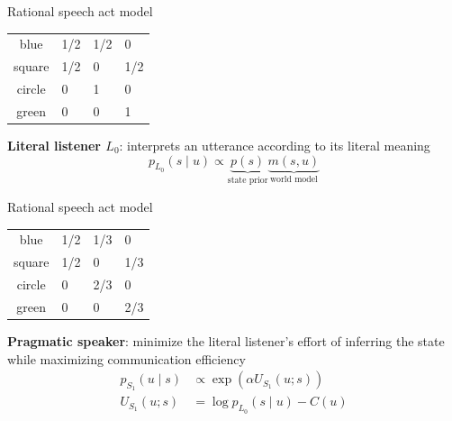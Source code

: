 \documentclass[usenames,dvipsnames,notes]{beamer}
\begin{document}
\begin{frame}
    {Rational speech act model}
    \begin{center}

        \begin{tabular}{cp{2cm}p{2cm}p{2cm}}
        blue & 1/2 & 1/2 & 0 \\
        square & 1/2 & 0 & 1/2 \\
        circle & 0 & 1 & 0 \\
        green & 0 & 0 & 1
        \end{tabular}
    \end{center}
    \textbf{Literal listener $L_0$}: interprets an utterance according to its literal meaning
    $$
    p_{L_0}(s\mid u) \propto \underbrace{p(s)}_{\text{state prior}}
    \underbrace{m(s,u)}_{\text{world model}}
    $$
\end{frame}

\begin{frame}
    {Rational speech act model}
    \begin{center}
        \begin{tabular}{cp{2cm}p{2cm}p{2cm}}
        blue   & 1/2 & 1/3   & 0 \\
        square & 1/2 & 0     & 1/3 \\
        circle & 0   & 2/3   & 0 \\
        green  & 0   & 0     & 2/3
        \end{tabular}
    \end{center}
    \textbf{Pragmatic speaker}: minimize the literal listener's effort of inferring the state while maximizing communication efficiency
    \begin{align*}
        p_{S_1}(u\mid s) &\propto \exp(\alpha U_{S_1}(u; s)) \\
        U_{S_1}(u; s) &= \log p_{L_0}(s\mid u) - C(u)
    \end{align*}
\end{frame}
\end{document}
